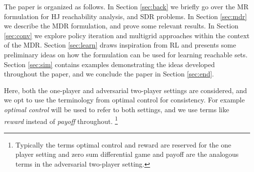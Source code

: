The paper is organized as follows. In Section \ref{sec:back} we briefly go over the MR formulation for HJ reachability analysis, and SDR problems. In Section \ref{sec:mdr} we describe the MDR formulation, and prove some relevant results. In Section \ref{sec:conv} we explore policy iteration and multigrid approaches within the context of the MDR. Section \ref{sec:learn} draws inspiration from RL and presents some preliminary ideas on how the formulation can be used for learning reachable sets. Section \ref{sec:sim} contains examples demonstrating the ideas developed throughout the paper, and we conclude the paper in Section \ref{sec:end}.

Here, both the one-player and adversarial two-player settings are considered, and we opt to use the terminology from optimal control for consistency. For example \emph{optimal control} will be used to refer to both settings, and we use terms like \emph{reward} instead of \emph{payoff} throughout. \footnote{Typically the terms optimal control and reward are reserved for the one player setting and zero sum differential game and payoff are the analogous terms in the adversarial two-player setting.}



